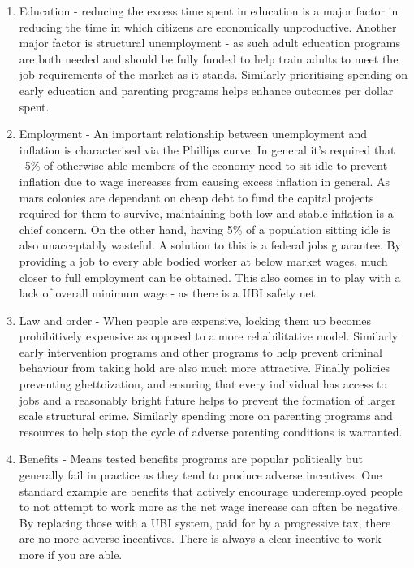\documentclass[10pt]{article}
\begin{document}
\begin{enumerate}

\item Education - reducing the excess time spent in education is a major factor in reducing the time in which citizens are economically unproductive. Another major factor is structural unemployment - as such adult education programs are both needed and should be fully funded to help train adults to meet the job requirements of the market as it stands. Similarly prioritising spending on early education and parenting programs helps enhance outcomes per dollar spent.

\item Employment - An important relationship between unemployment and inflation is characterised via the Phillips curve. In general it's required that ~5\% of otherwise able members of the economy need to sit idle to prevent inflation due to wage increases from causing excess inflation in general. As mars colonies are dependant on cheap debt to fund the capital projects required for them to survive, maintaining both low and stable inflation is a chief concern. On the other hand, having 5\% of a population sitting idle is also unacceptably wasteful. A solution to this is a federal jobs guarantee. By providing a job to every able bodied worker at below market wages, much closer to full employment can be obtained. This also comes in to play with a lack of overall minimum wage - as there is a UBI safety net 

\item Law and order - When people are expensive, locking them up becomes prohibitively expensive as opposed to a more rehabilitative model. Similarly early intervention programs and other programs to help prevent criminal behaviour from taking hold are also much more attractive. Finally policies preventing ghettoization, and ensuring that every individual has access to jobs and a reasonably bright future helps to prevent the formation of larger scale structural crime. Similarly spending more on parenting programs and resources to help stop the cycle of adverse parenting conditions is warranted.

\item Benefits - Means tested benefits programs are popular politically but generally fail in practice as they tend to produce adverse incentives. One standard example are benefits that actively encourage underemployed people to not attempt to work more as the net wage increase can often be negative. By replacing those with a UBI system, paid for by a progressive tax, there are no more adverse incentives. There is always a clear incentive to work more if you are able. 


\end{enumerate}
\end{document}
